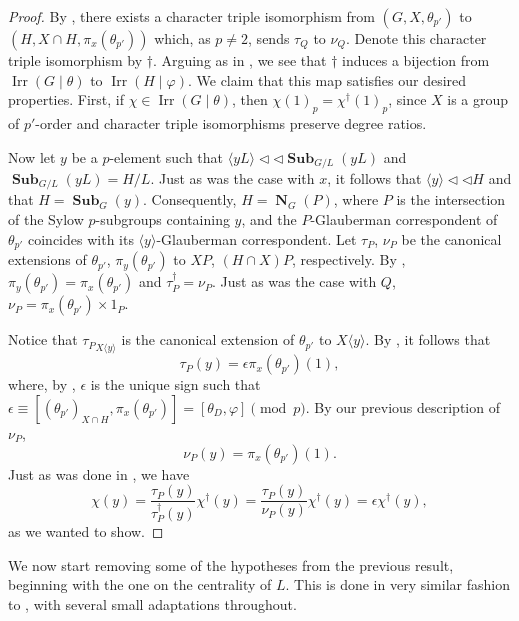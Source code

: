 \documentclass[12pt]{amsart}
\DeclareMathOperator{\NB}{\mathbf{N}}
\DeclareMathOperator{\Sub}{\mathbf{Sub}}
\DeclareMathOperator{\Irr}{Irr}
\theoremstyle{remark}
\theoremstyle{definition}
\theoremstyle{plain}
\theoremstyle{definition}
\numberwithin{equation}{section}
\begin{document}
\begin{proof}
	By , there exists a character triple isomorphism from $(G, X, \theta_{p'})$ to $(H, X \cap H, \pi_x(\theta_{p'}))$ which, as $p \neq 2$, sends $\tau_Q$ to $\nu_Q$. Denote this character triple isomorphism by $\dagger$. Arguing as in \cite[Theorem 3.1]{PickyPSolvable}, we see that $\dagger$ induces a bijection from $\Irr(G\mid\theta)$ to $\Irr(H \mid \varphi)$. We claim that this map satisfies our desired properties. First, if $\chi \in \Irr(G \mid \theta)$, then $\chi(1)_p = \chi^\dagger(1)_p$, since $X$ is a group of $p'$-order and character triple isomorphisms preserve degree ratios. 
	
	Now let $y$ be a $p$-element such that $\langle yL \rangle {\triangleleft}{\triangleleft} \Sub_{G/L}(yL)$ and $\Sub_{G/L}(yL) = H/L$. Just as was the case with $x$, it follows that $\langle y \rangle {\triangleleft}{\triangleleft} H$ and that $H = \Sub_G(y)$. Consequently, $H = \NB_G(P)$, where $P$ is the intersection of the Sylow $p$-subgroups containing $y$, and the $P$-Glauberman correspondent of $\theta_{p'}$ coincides with its $\langle y \rangle$-Glauberman correspondent. Let $\tau_P$, $\nu_P$ be the canonical extensions of $\theta_{p'}$, $\pi_y(\theta_{p'})$ to $XP$, $(H\cap X)P$, respectively. By , $\pi_y(\theta_{p'}) = \pi_x(\theta_{p'})$ and $\tau_P^\dagger = \nu_P$. Just as was the case with $Q$, $\nu_P = \pi_x(\theta_{p'}) \times 1_P$.
	
	Notice that ${\tau_P}_{X\langle y \rangle}$ is the canonical extension of $\theta_{p'}$ to $X \langle y \rangle$. By \cite[Theorem 13.6]{CTFG}, it follows that
	\begin{equation*}
		\tau_P(y) = \epsilon \pi_x(\theta_{p'})(1),
	\end{equation*}
	where, by \cite[Theorem 13.14]{CTFG}, $\epsilon$ is the unique sign such that $\epsilon \equiv [({\theta_{p'}})_{X\cap H}, \pi_x(\theta_{p'})] = [\theta_D, \varphi] \pmod{p}$. By our previous description of $\nu_P$,
	\begin{equation*}
		\nu_P(y) = \pi_x(\theta_{p'})(1).
	\end{equation*}
	Just as was done in , we have
	\begin{equation*}
		\chi(y) = \frac{\tau_P(y)}{\tau_P^\dagger(y)} \chi^\dagger(y) = \frac{\tau_P(y)}{\nu_P(y)} \chi^\dagger(y) = \epsilon \chi^\dagger(y),
	\end{equation*}
	as we wanted to show.
\end{proof}

We now start removing some of the hypotheses from the previous result, beginning with the one on the centrality of $L$. This is done in very similar fashion to \cite[Theorem 3.2]{PickyPSolvable}, with several small adaptations throughout.
\end{document}
